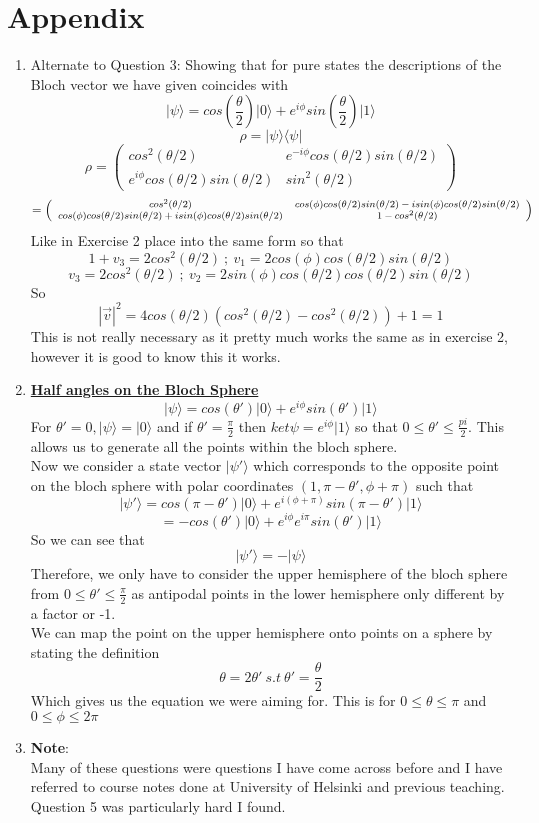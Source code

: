 \documentclass[12pt]{article}
\newcommand{\ket}[1]{\vert{#1}\rangle}
\newcommand{\bra}[1]{\langle{#1}\vert}
\begin{document}
\section{Appendix}
\begin{enumerate}
    \item Alternate to Question 3:
    Showing that for pure states the descriptions of the Bloch vector we have given coincides with 
$$ \ket{\psi} = cos(\frac{\theta}{2}) \ket{0} + e^{i \phi} sin(\frac{\theta}{2}) \ket{1} $$ 
$$ \rho = \ket{\psi}\bra{\psi} $$
$$ \rho = \left(\begin{array}{cc} cos^2(\theta / 2) & e^{-i \phi} cos(\theta /2) sin(\theta /2)  \\ e^{i \phi} cos(\theta /2 )sin(\theta /2) & sin^2 (\theta /2)\end{array}\right)$$
$$ = \footnotesize{\left(\begin{array}{cc} cos^2(\theta / 2) & cos(\phi) cos(\theta /2)sin(\theta /2) -isin(\phi)cos(\theta /2)sin(\theta /2)  \\ cos(\phi) cos(\theta /2 )sin(\theta /2) +isin(\phi) cos(\theta /2) sin(\theta /2) & 1-cos^2 (\theta /2)\end{array}\right)}$$
Like in Exercise 2  place into the same form so that 
$$ 1 + v_3 = 2 cos^2 (\theta /2 ) \ ; \ v_1 = 2cos(\phi) cos(\theta /2 ) sin(\theta /2) $$ 
$$ v_3 = 2cos^2 (\theta /2 ) \ ; \ v_2 = 2sin(\phi) cos(\theta /2) cos(\theta /2) sin(\theta /2) $$ 
So 
$$ |\vec{v}|^2 = 4 cos(\theta /2 ) (cos^2 (\theta /2 ) - cos^2(\theta /2)) + 1 = 1 $$
This is not really necessary as it pretty much works the same as in exercise 2, however it is good to know this it works. 
\item \textbf{\underline{Half angles on the Bloch Sphere}} 
\\
$$ \ket{\psi} = cos(\theta') \ket{0} + e^{i \phi} sin (\theta ') \ket{1} $$
For $\theta ' = 0, \ket{\psi} = \ket{0} $ and if $\theta' = \frac{\pi}{2}$ then $ket{\psi} = e^{i \phi} \ket{1}$ so that $0 \leq \theta ' \leq \frac{pi}{2}$. This allows us to generate all the points within the bloch sphere.
\\
Now we consider a state vector $\ket{\psi '} $ which corresponds to the opposite point on the bloch sphere with polar coordinates $(1, \pi - \theta ', \phi + \pi)$ such that 
$$ \ket{\psi '} = cos(\pi - \theta ') \ket{0} + e^{i(\phi + \pi)} sin(\pi - \theta ') \ket{1} $$
$$ = -cos(\theta ') \ket{0} + e^{i \phi} e^{i \pi} sin(\theta ') \ket{1} $$
So we can see that 
$$ \ket{\psi '} = -\ket{\psi} $$
Therefore, we only have to consider the upper hemisphere of the bloch sphere from $ 0 \leq \theta ' \leq \frac{\pi}{2}$ as antipodal points in the lower hemisphere only different by a factor or -1. 
\\
We can map the point on the upper hemisphere onto points on a sphere by stating the definition 
$$ \theta = 2\theta' \ s.t \ \theta ' = \frac{\theta}{2} $$
Which gives us the equation we were aiming for. This is for $0 \leq \theta \leq \pi$ and $0 \leq \phi \leq 2\pi$ 

\item \textbf{Note}:
\\
Many of these questions were questions I have come across before and I have referred to course notes done at University of Helsinki and previous teaching. Question 5 was particularly hard I found. 

\end{enumerate}
\end{document}

